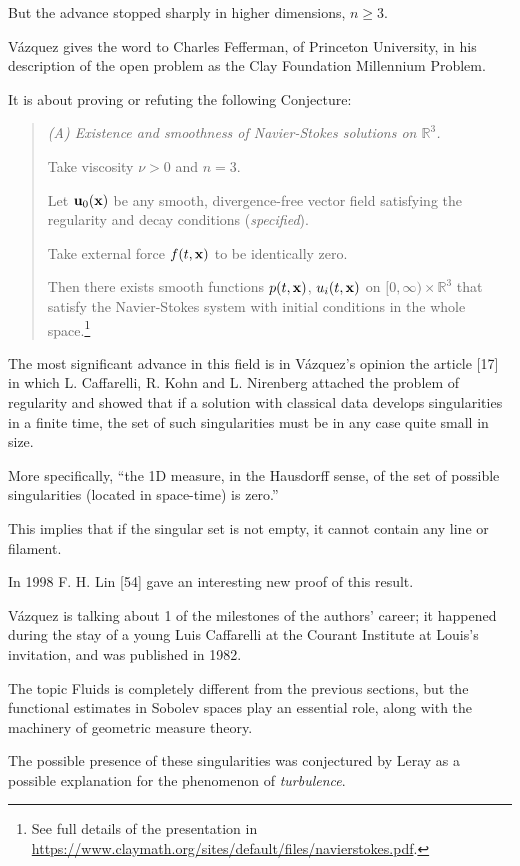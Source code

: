 \documentclass{article}
\begin{document}
But the advance stopped sharply in higher dimensions, $n\ge 3$.

V\'azquez gives the word to Charles Fefferman, of Princeton University, in his description of the open problem as the Clay Foundation Millennium Problem.

It is about proving or refuting the following Conjecture:
\begin{quotation}\it
	(A) Existence and smoothness of Navier-Stokes solutions on $\mathbb{R}^3$.
	
	Take viscosity $\nu > 0$ and $n = 3$.
	
	Let ${\bf u}_0({\bf x})$ be any smooth, divergence-free vector field satisfying the regularity and decay conditions (\emph{specified}).
	
	Take external force $f(t,{\bf x})$ to be identically zero.
	
	Then there exists smooth functions $p(t,{\bf x})$, $u_i(t,{\bf x})$ on $[0,\infty)\times\mathbb{R}^3$ that satisfy the Navier-Stokes system with initial conditions in the whole space.\footnote{See full details of the presentation in \url{https://www.claymath.org/sites/default/files/navierstokes.pdf}.}
\end{quotation}
The most significant advance in this field is in V\'azquez's opinion the article [17] in which L. Caffarelli, R. Kohn and L. Nirenberg attached the problem of regularity and showed that if a solution with classical data develops singularities in a finite time, the set of such singularities must be in any case quite small in size.

More specifically, ``the 1D measure, in the Hausdorff sense, of the set of possible singularities (located in space-time) is zero.''

This implies that if the singular set is not empty, it cannot contain any line or filament.

In 1998 F. H. Lin [54] gave an interesting new proof of this result.

%
V\'azquez is talking about 1 of the milestones of the authors' career; it happened during the stay of a young Luis Caffarelli at the Courant Institute at Louis's invitation, and was published in 1982.

The topic Fluids is completely different from the previous sections, but the functional estimates in Sobolev spaces play an essential role, along with the machinery of geometric measure theory.

%
The possible presence of these singularities was conjectured by Leray as a possible explanation for the phenomenon of \textit{turbulence}.
\end{document}
